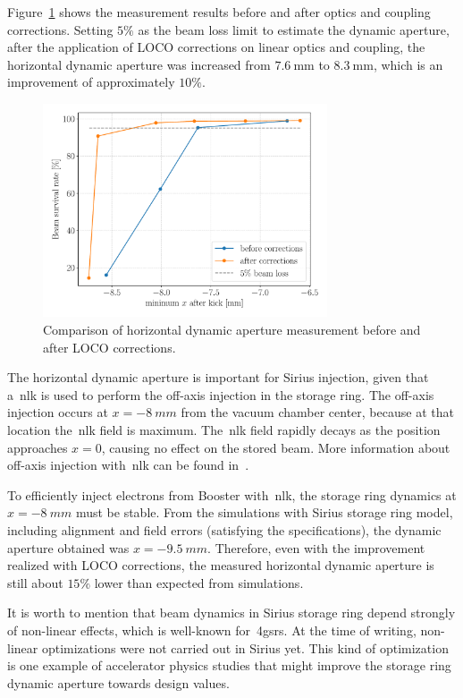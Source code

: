 Figure~\ref{fig:xdynap} shows the measurement results before and after optics and coupling corrections. Setting $5\%$ as the beam loss limit to estimate the dynamic aperture, after the application of LOCO corrections on linear optics and coupling, the horizontal dynamic aperture was increased from $\SI{7.6}{\milli\meter}$ to $\SI{8.3}{\milli\meter}$, which is an improvement of approximately $10\%$.
\begin{figure}
\centering
\includegraphics[width=0.75\textwidth]{figures/xdynamic_aperture_grid.pdf}
\caption{Comparison of horizontal dynamic aperture measurement before and after LOCO corrections.}
\label{fig:xdynap}
\end{figure}

The horizontal dynamic aperture is important for Sirius injection, given that a~\gls{nlk} is used to perform the off-axis injection in the storage ring. The off-axis injection occurs at $x=\SI{-8}{mm}$ from the vacuum chamber center, because at that location the~\gls{nlk} field is maximum. The~\gls{nlk} field rapidly decays as the position approaches $x=0$, causing no effect on the stored beam. More information about off-axis injection with~\gls{nlk} can be found in~\cite{liu2016a, wikinlk}.

To efficiently inject electrons from Booster with~\gls{nlk}, the storage ring dynamics at $x=\SI{-8}{mm}$ must be stable. From the simulations with Sirius storage ring model, including alignment and field errors (satisfying the specifications), the dynamic aperture obtained was $x=\SI{-9.5}{mm}$. Therefore, even with the improvement realized with LOCO corrections, the measured horizontal dynamic aperture is still about $15\%$ lower than expected from simulations. 

It is worth to mention that beam dynamics in Sirius storage ring depend strongly of non-linear effects, which is well-known for~\glspl{4gsr}. At the time of writing, non-linear optimizations were not carried out in Sirius yet. This kind of optimization is one example of accelerator physics studies that might improve the storage ring dynamic aperture towards design values.

